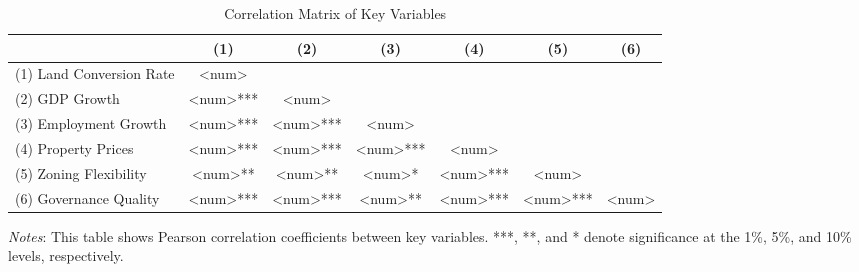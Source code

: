 
\begin{table}[ht]
\centering
\caption{Correlation Matrix of Key Variables}
\label{tab:correlation}
\begin{tabular}{lcccccc}
\toprule
 & (1) & (2) & (3) & (4) & (5) & (6) \\
\midrule
(1) Land Conversion Rate & <num> & & & & & \\
(2) GDP Growth & <num>*** & <num> & & & & \\
(3) Employment Growth & <num>*** & <num>*** & <num> & & & \\
(4) Property Prices & <num>*** & <num>*** & <num>*** & <num> & & \\
(5) Zoning Flexibility & <num>** & <num>** & <num>* & <num>*** & <num> & \\
(6) Governance Quality & <num>*** & <num>*** & <num>** & <num>*** & <num>*** & <num> \\
\bottomrule
\end{tabular}
\begin{tablenotes}
\small
\item \textit{Notes}: This table shows Pearson correlation coefficients between key variables. ***, **, and * denote significance at the 1\%, 5\%, and 10\% levels, respectively.
\end{tablenotes}
\end{table}


